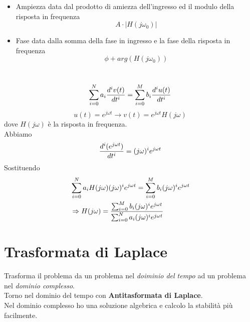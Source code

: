 \documentclass{article}
\begin{document}
			\begin{itemize}
				\item Ampiezza data dal prodotto di amiezza dell'ingresso ed il modulo della risposta in frequenza
				\[
					A \cdot \left|H(j\omega_0)\right|
				\]
				\item Fase data dalla somma della fase in ingresso e la fase della risposta in frequenza
				\[
					\phi + arg(H(j\omega_0))
				\]
			\end{itemize}
			\\
			\[
				\sum_{i=0}^{N} {a_i {{d^i v(t)}\over{dt^i}}} = \sum_{i=0}^{M} {b_i {{d^i u(t)}\over{dt^i}}}
			\]
			\[
				u(t) = e^{j\omega t} \rightarrow v(t) = e^{j\omega t} H(j\omega)
			\]
			dove $ H(j\omega) $ è la risposta in frequenza. \\
			Abbiamo
			\[
				{{d^i(e^{j\omega t})}\over{dt^i}} = (j\omega)^i e^{j\omega t}
			\]
			Sostituendo
			\[
				\begin{aligned}
					& \sum_{i=0}^{N} {a_i H(j\omega) (j\omega)^i e^{j\omega t}} = \sum_{i=0}^{M} {b_i (j\omega)^i e^{j\omega t}} \\
					& \Rightarrow H(j\omega) = {\sum_{i=0}^{M} {b_i (j\omega)^i e^{j\omega t}}\over{\sum_{i=0}^{N} {a_i (j\omega)^i e^{j\omega t}}}}
				\end{aligned}
			\]

	\section{Trasformata di Laplace}
		Trasforma il problema da un problema nel \textit{doiminio del tempo} ad un problema nel \textit{dominio complesso}. \\
		Torno nel dominio del tempo con \textbf{Antitasformata di Laplace}. \\
		Nel dominio complesso ho una soluzione algebrica e calcolo la stabilità più facilmente.
\end{document}
